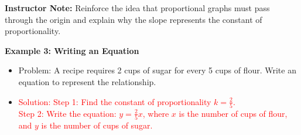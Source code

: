 \documentclass[12pt]{article}
\begin{document}
\begin{tcolorbox}[colframe=black!60, colback=white, 
coltitle=black, colbacktitle=black!15, fonttitle=\bfseries\Large, 
title=Examples, halign title=center, left=10pt, right=10pt, top=10pt, bottom=10pt]
{\color{blue} \textbf{Instructor Note:} Reinforce the idea that proportional graphs must pass through the origin and explain why the slope represents the constant of proportionality.}

\textbf{Example 3: Writing an Equation}
\begin{itemize}
    \item Problem: A recipe requires 2 cups of sugar for every 5 cups of flour. Write an equation to represent the relationship.
    \item \textcolor{red}{Solution: Step 1: Find the constant of proportionality \(k = \frac{2}{5}\). \\ 
    Step 2: Write the equation: \(y = \frac{2}{5}x\), where \(x\) is the number of cups of flour, and \(y\) is the number of cups of sugar.}
\end{itemize}

\end{tcolorbox}

\end{document}
